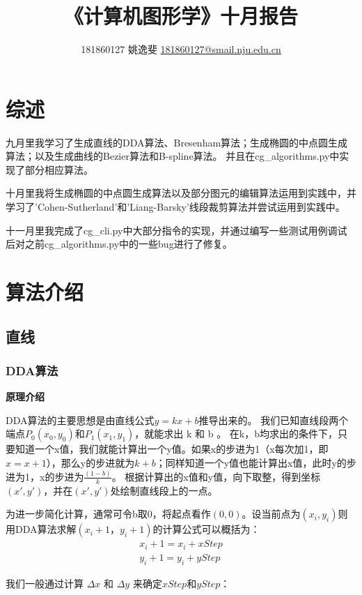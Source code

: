 \documentclass[a4paper,UTF8]{article}
\theoremstyle{definition}
\begin{document}
\title{\textbf{《计算机图形学》十月报告}}
\author{181860127   姚逸斐  \href{mailto:181860127@smail.nju.edu.cn}{181860127@smail.nju.edu.cn}}
\maketitle

\section{综述}
九月里我学习了生成直线的DDA算法、Bresenham算法；生成椭圆的中点圆生成算法；以及生成曲线的Bezier算法和B-spline算法。
并且在cg\_algorithms.py中实现了部分相应算法。

十月里我将生成椭圆的中点圆生成算法以及部分图元的编辑算法运用到实践中，并学习了'Cohen-Sutherland'和'Liang-Barsky'线段裁剪算法并尝试运用到实践中。

十一月里我完成了cg_cli.py中大部分指令的实现，并通过编写一些测试用例调试后对之前cg_algorithms.py中的一些bug进行了修复。

\section{算法介绍}
\subsection{直线}

\subsubsection{DDA算法}
\textbf{原理介绍}\par
DDA算法的主要思想是由直线公式$y = kx + b$推导出来的。
我们已知直线段两个端点$P_0(x_0,y_0)$和$P_1(x_1,y_1)$，就能求出 k 和 b 。
在k，b均求出的条件下，只要知道一个x值，我们就能计算出一个y值。如果x的步进为1（x每次加1，即$x = x +1$），那么y的步进就为$k+b$；同样知道一个y值也能计算出x值，此时y的步进为1，x的步进为$\frac{(1-b)}{k}$。
根据计算出的x值和y值，向下取整，得到坐标$(x',y')$，并在$(x',y')$处绘制直线段上的一点。

为进一步简化计算，通常可令b取0，将起点看作$(0,0)$。设当前点为$(x_i, y_i)$则用DDA算法求解$(x_i+1，y_i+1)$的计算公式可以概括为：
\begin{align}
    x_i+1 = x_i + xStep \\
    y_i+1 = y_i + yStep 
\end{align}

我们一般通过计算 $Δx$ 和 $Δy$ 来确定$xStep$和$yStep$：
\end{document}

